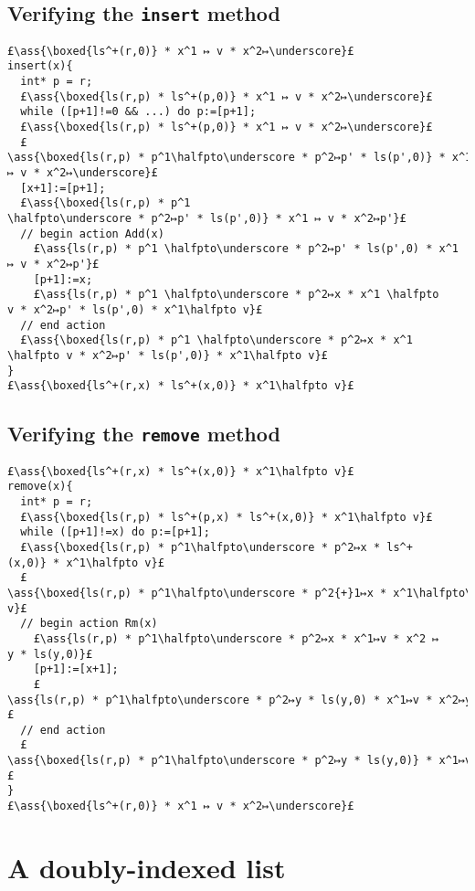 \documentclass[12pt,a4paper]{article}
\makeatletter
\newcommand{\ml}[2][t]{\mbox{\mdseries\begin{tabular}[#1]{@{}L@{}}#2\end{tabular}}}
\newcommand{\ass}[1]{\ensuremath{{\color{blue}\left\{\ml[c]{#1}\right\}}}}
\makeatother
\begin{document}
\subsection{Verifying the {\tt insert} method}

\begin{lstlisting}
£\ass{\boxed{ls^+(r,0)} * x^1 ↦ v * x^2↦\underscore}£
insert(x){
  int* p = r;
  £\ass{\boxed{ls(r,p) * ls^+(p,0)} * x^1 ↦ v * x^2↦\underscore}£
  while ([p+1]!=0 && ...) do p:=[p+1];
  £\ass{\boxed{ls(r,p) * ls^+(p,0)} * x^1 ↦ v * x^2↦\underscore}£
  £\ass{\boxed{ls(r,p) * p^1\halfpto\underscore * p^2↦p' * ls(p',0)} * x^1 ↦ v * x^2↦\underscore}£
  [x+1]:=[p+1];
  £\ass{\boxed{ls(r,p) * p^1 \halfpto\underscore * p^2↦p' * ls(p',0)} * x^1 ↦ v * x^2↦p'}£
  // begin action Add(x)
    £\ass{ls(r,p) * p^1 \halfpto\underscore * p^2↦p' * ls(p',0) * x^1 ↦ v * x^2↦p'}£
    [p+1]:=x;
    £\ass{ls(r,p) * p^1 \halfpto\underscore * p^2↦x * x^1 \halfpto v * x^2↦p' * ls(p',0) * x^1\halfpto v}£
  // end action
  £\ass{\boxed{ls(r,p) * p^1 \halfpto\underscore * p^2↦x * x^1 \halfpto v * x^2↦p' * ls(p',0)} * x^1\halfpto v}£
}
£\ass{\boxed{ls^+(r,x) * ls^+(x,0)} * x^1\halfpto v}£
\end{lstlisting}

\subsection{Verifying the {\tt remove} method}

\begin{lstlisting}
£\ass{\boxed{ls^+(r,x) * ls^+(x,0)} * x^1\halfpto v}£
remove(x){
  int* p = r;
  £\ass{\boxed{ls(r,p) * ls^+(p,x) * ls^+(x,0)} * x^1\halfpto v}£
  while ([p+1]!=x) do p:=[p+1];
  £\ass{\boxed{ls(r,p) * p^1\halfpto\underscore * p^2↦x * ls^+(x,0)} * x^1\halfpto v}£
  £\ass{\boxed{ls(r,p) * p^1\halfpto\underscore * p^2{+}1↦x * x^1\halfpto\underscore * x^2↦y * ls(y,0)} * x^1\halfpto v}£
  // begin action Rm(x) 
    £\ass{ls(r,p) * p^1\halfpto\underscore * p^2↦x * x^1↦v * x^2 ↦ y * ls(y,0)}£
    [p+1]:=[x+1];
    £\ass{ls(r,p) * p^1\halfpto\underscore * p^2↦y * ls(y,0) * x^1↦v * x^2↦y}£
  // end action
  £\ass{\boxed{ls(r,p) * p^1\halfpto\underscore * p^2↦y * ls(y,0)} * x^1↦v * x^2↦y}£
}
£\ass{\boxed{ls^+(r,0)} * x^1 ↦ v * x^2↦\underscore}£
\end{lstlisting}

\section{A doubly-indexed list}
\end{document}
